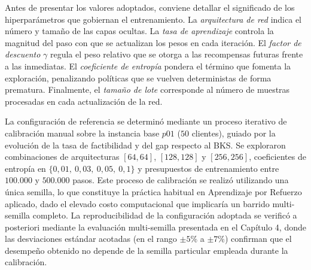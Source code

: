 Antes de presentar los valores adoptados, conviene detallar el significado de los hiperparámetros que gobiernan el entrenamiento. La \textit{arquitectura de red} indica el número y tamaño de las capas ocultas. La \textit{tasa de aprendizaje} controla la magnitud del paso con que se actualizan los pesos en cada iteración. El \textit{factor de descuento} $\gamma$ regula el peso relativo que se otorga a las recompensas futuras frente a las inmediatas. El \textit{coeficiente de entropía} pondera el término que fomenta la exploración, penalizando políticas que se vuelven deterministas de forma prematura. Finalmente, el \textit{tamaño de lote} corresponde al número de muestras procesadas en cada actualización de la red. 


La configuración de referencia se determinó mediante un proceso iterativo de calibración manual sobre la instancia base $p01$ ($50$ clientes), guiado por la evolución de la tasa de factibilidad y del gap respecto al BKS. Se exploraron combinaciones de arquitecturas $[64,64]$, $[128,128]$ y $[256,256]$, coeficientes de entropía en $\{0{,}01,\ 0{,}03,\ 0{,}05,\ 0{,}1\}$ y presupuestos de entrenamiento entre $100.000$ y $500.000$ pasos. Este proceso de calibración se realizó utilizando una única semilla, lo que constituye la práctica habitual en Aprendizaje por Refuerzo aplicado, dado el elevado costo computacional que implicaría un barrido multi-semilla completo. La reproducibilidad de la configuración adoptada se verificó a posteriori mediante la evaluación multi-semilla presentada en el Capítulo 4, donde las desviaciones estándar acotadas (en el rango $\pm 5\%$ a $\pm 7\%$) confirman que el desempeño obtenido no depende de la semilla particular empleada durante la calibración. 



